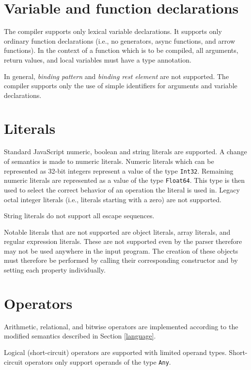 \section{Variable and function declarations}

The compiler supports only lexical variable declarations. It supports only ordinary function declarations (i.e., no generators, async functions, and arrow functions). In the context of a function which is to be compiled, all arguments, return values, and local variables must have a type annotation.

In general, \textit{binding pattern} and \textit{binding rest element} are not supported. The compiler supports only the use of simple identifiers for arguments and variable declarations.


\section{Literals}

Standard JavaScript numeric, boolean and string literals are supported. A change of semantics is made to numeric literals. Numeric literals which can be represented as 32-bit integers represent a value of the type \texttt{Int32}. Remaining numeric literals are represented as a value of the type \texttt{Float64}. This type is then used to select the correct behavior of an operation the literal is used in. Legacy octal integer literals (i.e., literals starting with a zero) are not supported.

String literals do not support all escape sequences.

Notable literals that are not supported are object literals, array literals, and regular expression literals. These are not supported even by the parser therefore may not be used anywhere in the input program. The creation of these objects must therefore be performed by calling their corresponding constructor and by setting each property individually.


\section{Operators}

Arithmetic, relational, and bitwise operators are implemented according to the modified semantics described in Section \ref{language}.

Logical (short-circuit) operators are supported with limited operand types. Short-circuit operators only support operands of the type \texttt{Any}.

